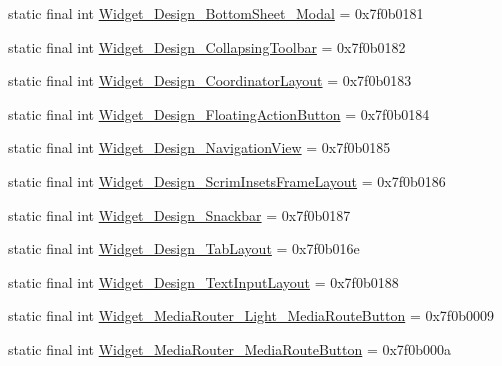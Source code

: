 \begin{CompactItemize}
\item 
static final int \hyperlink{classcom_1_1companyname_1_1x__2doo_1_1_r_1_1style_ac5e555a4d5b1519103c46203a1271e5}{Widget\_\-Design\_\-BottomSheet\_\-Modal} = 0x7f0b0181
\item 
static final int \hyperlink{classcom_1_1companyname_1_1x__2doo_1_1_r_1_1style_fa9a361261771718e6a641371fbfdbc0}{Widget\_\-Design\_\-CollapsingToolbar} = 0x7f0b0182
\item 
static final int \hyperlink{classcom_1_1companyname_1_1x__2doo_1_1_r_1_1style_7438df3ec41d70a768c4cdfe94cba7bb}{Widget\_\-Design\_\-CoordinatorLayout} = 0x7f0b0183
\item 
static final int \hyperlink{classcom_1_1companyname_1_1x__2doo_1_1_r_1_1style_91e8cd50eff798fe2059b681435cf8e9}{Widget\_\-Design\_\-FloatingActionButton} = 0x7f0b0184
\item 
static final int \hyperlink{classcom_1_1companyname_1_1x__2doo_1_1_r_1_1style_4124214d8c02aaa28e468eb92f1e3a48}{Widget\_\-Design\_\-NavigationView} = 0x7f0b0185
\item 
static final int \hyperlink{classcom_1_1companyname_1_1x__2doo_1_1_r_1_1style_88ad4a3b76f3cadb594294b5af4b6783}{Widget\_\-Design\_\-ScrimInsetsFrameLayout} = 0x7f0b0186
\item 
static final int \hyperlink{classcom_1_1companyname_1_1x__2doo_1_1_r_1_1style_0303b8b16393c7026d9ad362642af187}{Widget\_\-Design\_\-Snackbar} = 0x7f0b0187
\item 
static final int \hyperlink{classcom_1_1companyname_1_1x__2doo_1_1_r_1_1style_ec0557bd7d22d5978aff3aaaeaae7534}{Widget\_\-Design\_\-TabLayout} = 0x7f0b016e
\item 
static final int \hyperlink{classcom_1_1companyname_1_1x__2doo_1_1_r_1_1style_6c472b54543454c1347f410713c1d568}{Widget\_\-Design\_\-TextInputLayout} = 0x7f0b0188
\item 
static final int \hyperlink{classcom_1_1companyname_1_1x__2doo_1_1_r_1_1style_779d4fe75fc93738b23fc7c8cbd79302}{Widget\_\-MediaRouter\_\-Light\_\-MediaRouteButton} = 0x7f0b0009
\item 
static final int \hyperlink{classcom_1_1companyname_1_1x__2doo_1_1_r_1_1style_6fa6b554baba93fa8792da6abbf246c5}{Widget\_\-MediaRouter\_\-MediaRouteButton} = 0x7f0b000a
\end{CompactItemize}


